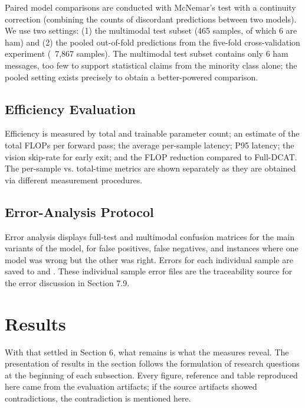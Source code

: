 \documentclass[10pt,twoside]{article}
\begin{document}
Paired model comparisons are conducted with McNemar's test \citep{mcnemar1947note} with a continuity correction (combining the counts of discordant predictions between two models). We use two settings: (1) the multimodal test subset (465 samples, of which 6 are ham) and (2) the pooled out-of-fold predictions from the five-fold cross-validation experiment (~7,867 samples). The multimodal test subset contains only 6 ham messages, too few to support statistical claims from the minority class alone; the pooled setting exists precisely to obtain a better-powered comparison.

\subsection{Efficiency Evaluation}\label{sec:6.7}

Efficiency is measured by total and trainable parameter count; an estimate of the total FLOPs per forward pass; the average per-sample latency; P95 latency; the vision skip-rate for early exit; and the FLOP reduction compared to Full-DCAT. The per-sample vs. total-time metrics are shown separately as they are obtained via different measurement procedures.

\subsection{Error-Analysis Protocol}\label{sec:6.8}

Error analysis displays full-test and multimodal confusion matrices for the main variants of the model, for false positives, false negatives, and instances where one model was wrong but the other was right. Errors for each individual sample are saved to  and . These individual sample error files are the traceability source for the error discussion in Section 7.9.

\section{Results}\label{sec:7}

With that settled in Section 6, what remains is what the measures reveal. The presentation of results in the section follows the formulation of research questions at the beginning of each subsection. Every figure, reference and table reproduced here came from the evaluation artifacts; if the source artifacts showed contradictions, the contradiction is mentioned here.
\end{document}
